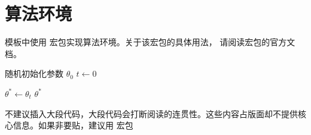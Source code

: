 \section{算法环境}

模板中使用  宏包实现算法环境。关于该宏包的具体用法，
请阅读宏包的官方文档。

\begin{algorithm}[H] %
  \SetAlgoLined

  \caption{随机梯度下降算法 (SGD)}
  \label{algo:sgd}


  随机初始化参数 $\theta_0$\;
  $t \leftarrow 0$\;
  
  
  $\theta^* \leftarrow \theta_t$\;
  \Return $\theta^*$
\end{algorithm}

不建议插入大段代码，大段代码会打断阅读的连贯性。这些内容占版面却不提供核心信息。如果非要贴，建议用   宏包
